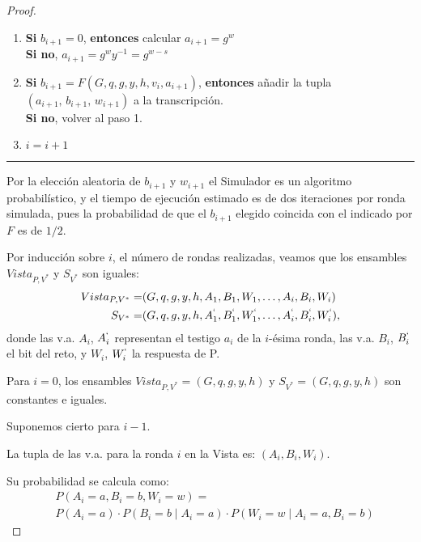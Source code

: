 \begin{proof}
\begin{enumerate}
		\item \textbf{Si} $b_{i+1} = 0$, \textbf{entonces} calcular \qquad $a_{i+1} = g^w$ \\
		\textbf{Si no}, \qquad \qquad \qquad \qquad \qquad \qquad \quad $a_{i+1} = g^w y^{-1} = g^{w-s}$
		
		\item \textbf{Si} $b_{i+1} = F(G, q, g, y,h,v_i,a_{i+1})$, \textbf{entonces} añadir la tupla \\ $(a_{i+1},\,b_{i+1},\,w_{i+1})$ a la transcripción. \\
		\textbf{Si no}, volver al paso 1.
		
		\item $i = i+1$
		
	\end{enumerate}
	
	\rule{\textwidth}{1pt}
	
	\hfill
	
	Por la elección aleatoria de $b_{i+1}$ y $w_{i+1}$ el Simulador es un algoritmo probabilístico, y el tiempo de ejecución estimado es de dos iteraciones por ronda simulada, pues la probabilidad de que el $b_{i+1}$ elegido coincida con el indicado por $F$ es de $1/2$.
	
	
	\hfil
	
	
	Por inducción sobre $i$, el número de rondas realizadas, veamos que los ensambles $Vista_{P,V^*}$ y $S_{V^*}$ son iguales:
	\begin{align*}
		Vista_{P,V^*} =& (G,q,g,y,h,A_1,B_1,W_1, \dots , A_i,B_i,W_i) \\
		S_{V^*} =& (G,q,g,y,h,A_1^`,B_1^`,W_1^`, \dots , A_i^`,B_i^`,W_i^`),
	\end{align*}
	donde las v.a. $A_i$, $A_i^`$ representan el testigo $a_i$ de la $i$-ésima ronda, las v.a. $B_i$, $B_i^`$ el bit del reto, y $W_i$, $W_i^`$ la respuesta de P.
	
	\hfil
	
	Para $i=0$, los ensambles $Vista_{P,V^*} = (G,q,g,y,h)$ y $S_{V^*} = (G,q,g,y,h)$ son constantes e iguales.
	
	Suponemos cierto para $i-1$.
	
	La tupla de las v.a. para la ronda $i$ en la Vista es: $(A_i,B_i,W_i)$.
	
	Su probabilidad se calcula como:
	\begin{align*}
	& P(A_i=a, B_i=b, W_i = w) = \\
	& P(A_i = a) \cdot P(B_i = b \mid A_i = a) \cdot P(W_i = w \mid A_i = a, B_i=b)
	\end{align*}
	

\end{proof}

